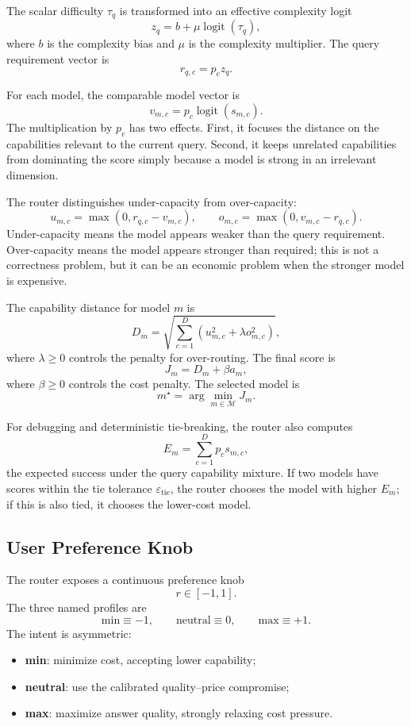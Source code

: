 The scalar difficulty \(\tau_q\) is transformed into an effective complexity
logit
\[
  z_q = b + \mu \operatorname{logit}(\tau_q),
\]
where \(b\) is the complexity bias and \(\mu\) is the complexity multiplier.
The query requirement vector is
\[
  r_{q,c}=p_c z_q.
\]

For each model, the comparable model vector is
\[
  v_{m,c}=p_c \operatorname{logit}(s_{m,c}).
\]
The multiplication by \(p_c\) has two effects. First, it focuses the distance
on the capabilities relevant to the current query. Second, it keeps unrelated
capabilities from dominating the score simply because a model is strong in an
irrelevant dimension.

The router distinguishes under-capacity from over-capacity:
\[
  u_{m,c} = \max(0,r_{q,c}-v_{m,c}),
  \qquad
  o_{m,c} = \max(0,v_{m,c}-r_{q,c}).
\]
Under-capacity means the model appears weaker than the query requirement.
Over-capacity means the model appears stronger than required; this is not a
correctness problem, but it can be an economic problem when the stronger model
is expensive.

The capability distance for model \(m\) is
\[
  D_m
  =
  \sqrt{
    \sum_{c=1}^{D}
    \left(
      u_{m,c}^{2}+\lambda o_{m,c}^{2}
    \right)
  },
\]
where \(\lambda\ge0\) controls the penalty for over-routing. The final score is
\[
  J_m = D_m + \beta a_m,
\]
where \(\beta\ge0\) controls the cost penalty. The selected model is
\[
  m^\star = \arg\min_{m\in\mathcal{M}} J_m.
\]

For debugging and deterministic tie-breaking, the router also computes
\[
  E_m=\sum_{c=1}^{D} p_c s_{m,c},
\]
the expected success under the query capability mixture. If two models have
scores within the tie tolerance \(\varepsilon_{\mathrm{tie}}\), the router
chooses the model with higher \(E_m\); if this is also tied, it chooses the
lower-cost model.

\subsection{User Preference Knob}
\label{sec:brick-knob}

The router exposes a continuous preference knob
\[
  r\in[-1,1].
\]
The three named profiles are
\[
  \mathrm{min}\equiv -1,\qquad
  \mathrm{neutral}\equiv 0,\qquad
  \mathrm{max}\equiv +1.
\]
The intent is asymmetric:
\begin{itemize}
  \item \textbf{min}: minimize cost, accepting lower capability;
  \item \textbf{neutral}: use the calibrated quality--price compromise;
  \item \textbf{max}: maximize answer quality, strongly relaxing cost pressure.
\end{itemize}


